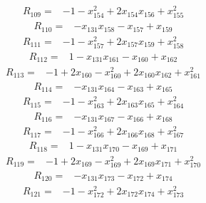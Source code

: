 {%
\begin{align*}
R_{109} ={}& -1 - x_{154}^{2} + 2x_{154} x_{156} + x_{155}^{2}
\end{align*}
\begin{align*}
R_{110} ={}& -x_{131} x_{158} - x_{157} + x_{159}
\end{align*}
\begin{align*}
R_{111} ={}& -1 - x_{157}^{2} + 2x_{157} x_{159} + x_{158}^{2}
\end{align*}
\begin{align*}
R_{112} ={}& 1 - x_{131} x_{161} - x_{160} + x_{162}
\end{align*}
\begin{align*}
R_{113} ={}& -1 + 2x_{160} - x_{160}^{2} + 2x_{160} x_{162} + x_{161}^{2}
\end{align*}
\begin{align*}
R_{114} ={}& -x_{131} x_{164} - x_{163} + x_{165}
\end{align*}
\begin{align*}
R_{115} ={}& -1 - x_{163}^{2} + 2x_{163} x_{165} + x_{164}^{2}
\end{align*}
\begin{align*}
R_{116} ={}& -x_{131} x_{167} - x_{166} + x_{168}
\end{align*}
\begin{align*}
R_{117} ={}& -1 - x_{166}^{2} + 2x_{166} x_{168} + x_{167}^{2}
\end{align*}
\begin{align*}
R_{118} ={}& 1 - x_{131} x_{170} - x_{169} + x_{171}
\end{align*}
\begin{align*}
R_{119} ={}& -1 + 2x_{169} - x_{169}^{2} + 2x_{169} x_{171} + x_{170}^{2}
\end{align*}
\begin{align*}
R_{120} ={}& -x_{131} x_{173} - x_{172} + x_{174}
\end{align*}
\begin{align*}
R_{121} ={}& -1 - x_{172}^{2} + 2x_{172} x_{174} + x_{173}^{2}

\end{align*}}
